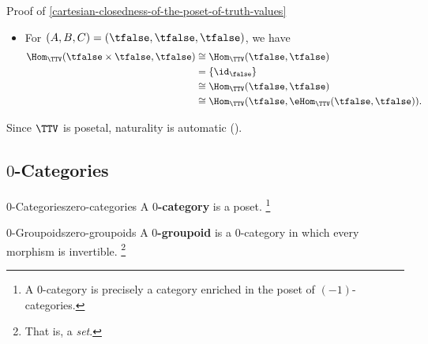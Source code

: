 \begin{Proof}{Proof of \cref{cartesian-closedness-of-the-poset-of-truth-values}}
\begin{itemize}
            \begin{align*}
                \Hom_{\TTV}(\tfalse\times\tfalse,\ttrue)  &\cong \Hom_{\TTV}(\tfalse,\ttrue)\\
                                                          &\cong \pt\\
                                                          &\cong \Hom_{\TTV}(\tfalse,\ttrue)\\
                                                          &\cong \Hom_{\TTV}(\tfalse,\eHom_{\TTV}(\tfalse,\ttrue)).
            \end{align*}
        \item For $(A,B,C)=(\tfalse,\tfalse,\tfalse)$, we have
            \begin{align*}
                \Hom_{\TTV}(\tfalse\times\tfalse,\tfalse) &\cong \Hom_{\TTV}(\tfalse,\tfalse)\\
                                                          &=     \{\id_{\false}\}\\
                                                          &\cong \Hom_{\TTV}(\tfalse,\tfalse)\\
                                                          &\cong \Hom_{\TTV}(\tfalse,\eHom_{\TTV}(\tfalse,\tfalse)).
            \end{align*}
    \end{itemize}
    Since $\TTV$ is posetal, naturality is automatic ().
\end{Proof}
\subsection{$0$-Categories}\label{subsection-zero-categories}
\begin{definition}{$0$-Categories}{zero-categories}%
    A \textbf{$0$-category} is a poset.%
    \footnote{%
        A $0$-category is precisely a category enriched in the poset of $(-1)$-categories.
        \par\vspace*{\TCBBoxCorrection}
    }%
\end{definition}
\begin{definition}{$0$-Groupoids}{zero-groupoids}%
    A \textbf{$0$-groupoid} is a $0$-category in which every morphism is invertible.%
    \footnote{%
        That is, a \emph{set}.
        \par\vspace*{\TCBBoxCorrection}
    }%
\end{definition}
